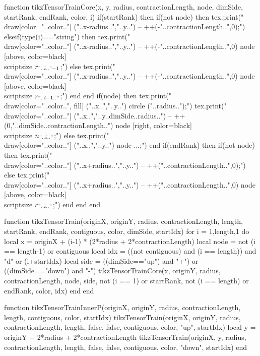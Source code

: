 \begin{luacode*}
function tikzTensorTrainCore(x, y, radius, contractionLength, node, dimSide, startRank, endRank, color, i)
	 if(startRank) then
			if(not node) then
				 tex.print("\\draw[color="..color.."] ("..x-radius..","..y..") -- ++(-"..contractionLength..",0);")
			elseif(type(i)=="string") then
				 tex.print("\\draw[color="..color.."] ("..x-radius..","..y..") -- ++(-"..contractionLength..",0) node [above, color=black] {\\scriptsize $r_{"..i.."-1}$};")
			else
				 tex.print("\\draw[color="..color.."] ("..x-radius..","..y..") -- ++(-"..contractionLength..",0) node [above, color=black] {\\scriptsize $r_{".. i-1 .."}$};")
			end
	 end
	 if(node) then
			tex.print("\\draw[color="..color..", fill] ("..x..","..y..") circle ("..radius..");")
			tex.print("\\draw[color="..color.."] ("..x..","..y..dimSide..radius..") -- ++(0,"..dimSide..contractionLength..") node [right, color=black] {\\scriptsize $n_{"..i.."}$};")
	 else
			tex.print("\\draw[color="..color.."] ("..x..","..y..") node {...};")
	 end
	 if(endRank) then
			if(not node) then
				 tex.print("\\draw[color="..color.."] ("..x+radius..","..y..") -- ++("..contractionLength..",0);")
			else
				 tex.print("\\draw[color="..color.."] ("..x+radius..","..y..") -- ++("..contractionLength..",0) node [above, color=black] {\\scriptsize $r_{"..i.."}$};")
			end
	 end
end

function tikzTensorTrain(originX, originY, radius, contractionLength, length, startRank, endRank, contiguous, color, dimSide, startIdx)
	 for i = 1,length,1 do
			local x = originX + (i-1) * (2*radius + 2*contractionLength)
			local node = not (i == length-1) or contiguous
			local idx = ((not contiguous) and (i == length)) and "d" or (i+startIdx)
			local side = ((dimSide=="up") and "+") or ((dimSide=="down") and "-")
			tikzTensorTrainCore(x, originY, radius, contractionLength, node, side, not (i == 1) or startRank, not (i == length) or endRank, color, idx)
	 end
end

function tikzTensorTrainInnerP(originX, originY, radius, contractionLength, length, contiguous, color, startIdx)
	 tikzTensorTrain(originX, originY, radius, contractionLength, length, false, false, contiguous, color, "up", startIdx)
	 local y = originY + 2*radius + 2*contractionLength
	 tikzTensorTrain(originX, y, radius, contractionLength, length, false, false, contiguous, color, "down", startIdx)
end


\end{luacode*}
